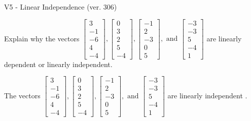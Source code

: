 \begin{exercise}
  \begin{exerciseTitle}V5 - Linear Independence (ver. 306)\end{exerciseTitle}
  \begin{exerciseStatement}
    Explain why the vectors \(\left[\begin{array}{r}
3 \\
-1 \\
-6 \\
4 \\
-4
\end{array}\right] , \left[\begin{array}{r}
0 \\
3 \\
2 \\
5 \\
-4
\end{array}\right] , \left[\begin{array}{r}
-1 \\
2 \\
-3 \\
0 \\
5
\end{array}\right] , \text{ and } \left[\begin{array}{r}
-3 \\
-3 \\
5 \\
-4 \\
1
\end{array}\right]\) are linearly dependent or linearly independent.	


  \end{exerciseStatement}
  \begin{exerciseAnswer}
   The vectors \(\left[\begin{array}{r}
3 \\
-1 \\
-6 \\
4 \\
-4
\end{array}\right] , \left[\begin{array}{r}
0 \\
3 \\
2 \\
5 \\
-4
\end{array}\right] , \left[\begin{array}{r}
-1 \\
2 \\
-3 \\
0 \\
5
\end{array}\right] , \text{ and } \left[\begin{array}{r}
-3 \\
-3 \\
5 \\
-4 \\
1
\end{array}\right]\) are 
  	 linearly independent  .
  


  \end{exerciseAnswer}
\end{exercise}